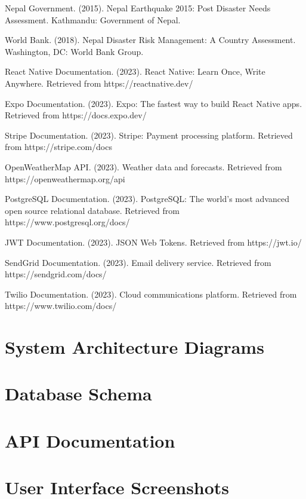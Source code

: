 \documentclass[12pt,a4paper]{article}
\begin{document}
\begin{thebibliography}{99}

 Nepal Government. (2015). Nepal Earthquake 2015: Post Disaster Needs Assessment. Kathmandu: Government of Nepal.

 World Bank. (2018). Nepal Disaster Risk Management: A Country Assessment. Washington, DC: World Bank Group.

 React Native Documentation. (2023). React Native: Learn Once, Write Anywhere. Retrieved from https://reactnative.dev/

 Expo Documentation. (2023). Expo: The fastest way to build React Native apps. Retrieved from https://docs.expo.dev/

 Stripe Documentation. (2023). Stripe: Payment processing platform. Retrieved from https://stripe.com/docs

 OpenWeatherMap API. (2023). Weather data and forecasts. Retrieved from https://openweathermap.org/api

 PostgreSQL Documentation. (2023). PostgreSQL: The world's most advanced open source relational database. Retrieved from https://www.postgresql.org/docs/

 JWT Documentation. (2023). JSON Web Tokens. Retrieved from https://jwt.io/

 SendGrid Documentation. (2023). Email delivery service. Retrieved from https://sendgrid.com/docs/

 Twilio Documentation. (2023). Cloud communications platform. Retrieved from https://www.twilio.com/docs/

\end{thebibliography}

\appendix

\section{System Architecture Diagrams}


\section{Database Schema}


\section{API Documentation}


\section{User Interface Screenshots}

\end{document}
